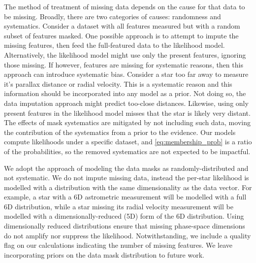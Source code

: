 \documentclass[twocolumn]{aastex631}
\begin{document}
        The method of treatment of missing data depends on the cause for that data to be missing.
        Broadly, there are two categories of causes: randomness and systematics.
        Consider a dataset with all features measured but with a random subset of features masked.
        One possible approach is to attempt to impute the missing features, then feed the full-featured data to the likelihood model. Alternatively, the likelihood model might use only the present features, ignoring those missing. If however, features are missing for systematic reasons, then this approach can introduce systematic bias. Consider a star too far away to measure it's parallax distance or radial velocity. This is a systematic reason and this information should be incorporated into any model as a prior. Not doing so, the data imputation approach might predict too-close distances. Likewise, using only present features in the likelihood model misses that the star is likely very distant.
        The effects of mask systematics are mitigated by not including such data,
        moving the contribution of the systematics from a prior to the evidence.
        Our models compute likelihoods under a specific dataset, and \autoref{eq:membership_prob} is a ratio of the probabilities, so the removed systematics are not expected to be impactful.

        We adopt the approach of modeling the data masks as randomly-distributed and not systematic. We do not impute missing data, instead the per-star likelihood is modelled with a distribution with the same dimensionality as the data vector.
        For example, a star with a 6D astrometric measurement will be modelled with a full 6D distribution, while a star missing its radial velocity measurement will be modelled with a dimensionally-reduced (5D) form of the 6D distribution. Using dimensionally reduced distributions ensure that missing phase-space dimensions do not amplify nor suppress the likelihood. 
        Notwithstanding, we include a quality flag on our calculations indicating the number of missing features.
        We leave incorporating priors on the data mask distribution to future work. 

\end{document}
